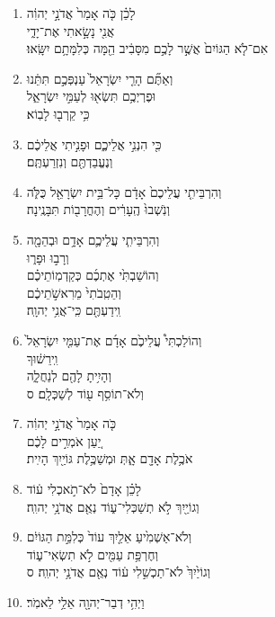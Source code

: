 \documentclass[12pt,a4paper,titlepage]{article}
\def \pslabelsep{-0.9em} %
\def \psleftmargin{0em} %
\begin{document}
\begin{enumerate}[leftmargin=\psleftmargin, labelsep = \pslabelsep, label={\arabic*}, font=\color{\pscolor}\small\textsuperscript, parsep=0em, itemsep=0em, topsep=0em ]
\item \texthebrew{לָכֵ֗ן כֹּ֤ה אָמַר֙ אֲדֹנָ֣י יְהוִ֔ה \\ אֲנִ֖י נָשָׂ֣אתִי אֶת־יָדִ֑י \\ אִם־לֹ֤א הַגּוֹיִם֙ אֲשֶׁ֣ר לָכֶ֣ם מִסָּבִ֔יב הֵ֖מָּה כְּלִמָּתָ֥ם יִשָּֽׂאוּ׃} \verseSpace
\item \texthebrew{וְאַתֶּ֞ם הָרֵ֤י יִשְׂרָאֵל֙ עַנְפְּכֶ֣ם תִּתֵּ֔נוּ \\ וּפֶרְיְכֶ֥ם תִּשְׂא֖וּ לְעַמִּ֣י יִשְׂרָאֵ֑ל \\ כִּ֥י קֵרְב֖וּ לָבֽוֹא׃}
\item \texthebrew{כִּ֖י הִנְנִ֣י אֲלֵיכֶ֑ם וּפָנִ֣יתִי אֲלֵיכֶ֔ם \\ וְנֶעֱבַדְתֶּ֖ם וְנִזְרַעְתֶּֽם׃}
\item \texthebrew{וְהִרְבֵּיתִ֤י עֲלֵיכֶם֙ אָדָ֔ם כָּל־בֵּ֥ית יִשְׂרָאֵ֖ל כֻּלֹּ֑ה \\ וְנֹֽשְׁבוּ֙ הֶֽעָרִ֔ים וְהֶחֳרָב֖וֹת תִּבָּנֶֽינָה׃}
\item \texthebrew{וְהִרְבֵּיתִ֧י עֲלֵיכֶ֛ם אָדָ֥ם וּבְהֵמָ֖ה \\ וְרָב֣וּ וּפָר֑וּ \\ וְהוֹשַׁבְתִּ֙י אֶתְכֶ֜ם כְּקַדְמֽוֹתֵיכֶ֗ם \\ וְהֵטִֽבֹתִי֙ מֵרִאשֹׁ֣תֵיכֶ֔ם \\ וִֽידַעְתֶּ֖ם כִּֽי־אֲנִ֥י יְהוָֽה׃}
\item \texthebrew{וְהוֹלַכְתִּי֩ עֲלֵיכֶ֙ם אָדָ֜ם אֶת־עַמִּ֤י יִשְׂרָאֵל֙ \\ וִֽירֵשׁ֔וּךָ \\ וְהָיִ֥יתָ לָהֶ֖ם לְנַחֲלָ֑ה \\ וְלֹא־תוֹסִ֥ף ע֖וֹד לְשַׁכְּלָֽם׃ ס} \newpage
\item \texthebrew{כֹּ֤ה אָמַר֙ אֲדֹנָ֣י יְהוִ֔ה \\ יַ֚עַן אֹמְרִ֣ים לָכֶ֔ם \\ אֹכֶ֥לֶת אָדָ֖ם אָ֑תְּ וּמְשַׁכֶּ֥לֶת גּוֹיַ֖יִךְ הָיִֽית׃}
\item \texthebrew{לָכֵ֗ן אָדָם֙ לֹא־תֹ֣אכְלִי ע֔וֹד \\ וְגוֹיַ֖יִךְ לֹ֣א תְשַׁכְּלִי־ע֑וֹד נְאֻ֖ם אֲדֹנָ֥י יְהוִֽה׃}
\item \texthebrew{וְלֹא־אַשְׁמִ֙יעַ אֵלַ֤יִךְ עוֹד֙ כְּלִמַּ֣ת הַגּוֹיִ֔ם \\ וְחֶרְפַּ֥ת עַמִּ֖ים לֹ֣א תִשְׂאִי־ע֑וֹד \\ וְגוֹיַ֙יִךְ֙ לֹא־תַכְשִׁ֣לִי ע֔וֹד נְאֻ֖ם אֲדֹנָ֥י יְהוִֽה׃ ס} \parSpace
\item \texthebrew{וַיְהִ֥י דְבַר־יְהוָ֖ה אֵלַ֥י לֵאמֹֽר׃}

\end{enumerate}
\end{document}
